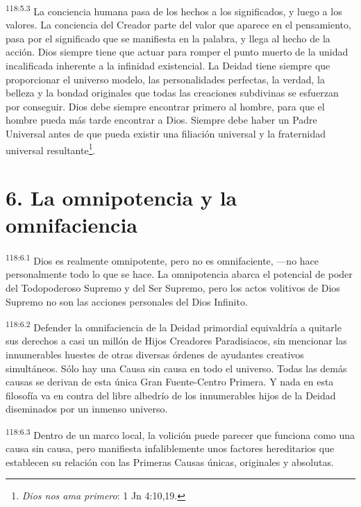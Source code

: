 \documentclass[twoside, 11pt]{book}
\begin{document}
\par
\textsuperscript{118:5.3} La conciencia humana pasa de los hechos a los significados, y luego a los valores. La conciencia del Creador parte del valor que aparece en el pensamiento, pasa por el significado que se manifiesta en la palabra, y llega al hecho de la acción. Dios siempre tiene que actuar para romper el punto muerto de la unidad incalificada inherente a la infinidad existencial. La Deidad tiene siempre que proporcionar el universo modelo, las personalidades perfectas, la verdad, la belleza y la bondad originales que todas las creaciones subdivinas se esfuerzan por conseguir. Dios debe siempre encontrar primero al hombre, para que el hombre pueda más tarde encontrar a Dios. Siempre debe haber un Padre Universal antes de que pueda existir una filiación universal y la fraternidad universal resultante\footnote{\textit{Dios nos ama primero}: 1 Jn 4:10,19.}.

\section*{6. La omnipotencia y la omnifaciencia}
\par
\textsuperscript{118:6.1} Dios es realmente omnipotente, pero no es omnifaciente, ---no hace personalmente todo lo que se hace. La omnipotencia abarca el potencial de poder del Todopoderoso Supremo y del Ser Supremo, pero los actos volitivos de Dios Supremo no son las acciones personales del Dios Infinito.

\par
\textsuperscript{118:6.2} Defender la omnifaciencia de la Deidad primordial equivaldría a quitarle sus derechos a casi un millón de Hijos Creadores Paradisiacos, sin mencionar las innumerables huestes de otras diversas órdenes de ayudantes creativos simultáneos. Sólo hay una Causa sin causa en todo el universo. Todas las demás causas se derivan de esta única Gran Fuente-Centro Primera. Y nada en esta filosofía va en contra del libre albedrío de los innumerables hijos de la Deidad diseminados por un inmenso universo.

\par
\textsuperscript{118:6.3} Dentro de un marco local, la volición puede parecer que funciona como una causa sin causa, pero manifiesta infaliblemente unos factores hereditarios que establecen su relación con las Primeras Causas únicas, originales y absolutas.
\end{document}

